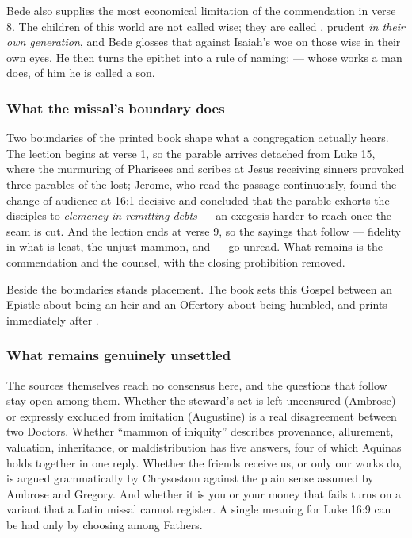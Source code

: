 Bede also supplies the most economical limitation of the commendation in verse
8. The children of this world are not called wise; they are called
, prudent \emph{in their own
generation}, and Bede glosses that against Isaiah's woe on those wise in their
own eyes. He then turns the epithet into a rule of naming:  --- whose works a man does, of
him he is called a son.

\subsubsection*{What the missal's boundary does}

Two boundaries of the printed book shape what a congregation actually hears. The
lection begins at verse 1, so the parable arrives detached from Luke 15, where
the murmuring of Pharisees and scribes at Jesus receiving sinners provoked three
parables of the lost; Jerome, who read the passage continuously, found the
change of audience at 16:1 decisive and concluded that the parable exhorts the
disciples to \emph{clemency in remitting debts} --- an exegesis harder to reach
once the seam is cut. And the lection ends at verse 9, so the sayings that
follow --- fidelity in what is least, the unjust mammon, and  --- go unread. What remains is the
commendation and the counsel, with the closing prohibition removed.

Beside the boundaries stands placement. The book sets this Gospel between an
Epistle about being an heir and an Offertory about being humbled, and prints
 immediately after .

\subsubsection*{What remains genuinely unsettled}

The sources themselves reach no consensus here, and the questions that follow
stay open among them. Whether the steward's act is left uncensured (Ambrose) or expressly excluded
from imitation (Augustine) is a real disagreement between two Doctors. Whether
``mammon of iniquity'' describes provenance, allurement, valuation,
inheritance, or maldistribution has five answers, four of which Aquinas holds
together in one reply. Whether the friends receive us, or only our works do, is
argued grammatically by Chrysostom against the plain sense assumed by Ambrose
and Gregory. And whether it is you or your money that fails turns on a variant
that a Latin missal cannot register. A single meaning for Luke 16:9 can be had
only by choosing among Fathers.

